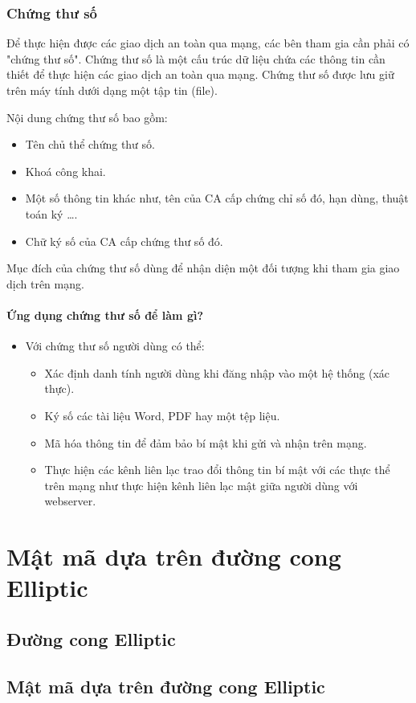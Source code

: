 \documentclass[a4paper,12pt]{report}
\begin{document}
\subsection*{Chứng thư số}
Để thực hiện được các giao dịch an toàn qua mạng, các bên tham gia cần phải có "chứng thư số". Chứng thư số là một cấu trúc dữ liệu chứa các thông tin cần thiết để thực hiện các giao dịch an toàn qua mạng. Chứng thư số được lưu giữ trên máy tính dưới dạng một tập tin (file).

Nội dung chứng thư số bao gồm:
\begin{itemize}
\item Tên chủ thể chứng thư số.
\item Khoá công khai.
\item Một số thông tin khác như, tên của CA cấp chứng chỉ số đó, hạn dùng, thuật toán ký \ldots.
\item Chữ ký số của CA cấp chứng thư số đó.
\end{itemize}

Mục đích của chứng thư số dùng để nhận diện một đối tượng khi tham gia giao dịch trên mạng.

\subsubsection{Ứng dụng chứng thư số để làm gì?}
\begin{itemize}
\item Với chứng thư số người dùng có thể:
\begin{itemize}
\item Xác định danh tính người dùng khi đăng nhập vào một hệ thống (xác thực).
\item Ký số các tài liệu Word, PDF hay một tệp liệu.
\item Mã hóa thông tin để đảm bảo bí mật khi gửi và nhận trên mạng.
\item Thực hiện các kênh liên lạc trao đổi thông tin bí mật với các thực thể trên mạng như thực hiện kênh liên lạc mật giữa người dùng với webserver.
\end{itemize}
\end{itemize}
\chapter{Mật mã dựa trên đường cong Elliptic}
\section{Đường cong Elliptic}
\section{Mật mã dựa trên đường cong Elliptic}
\end{document}
